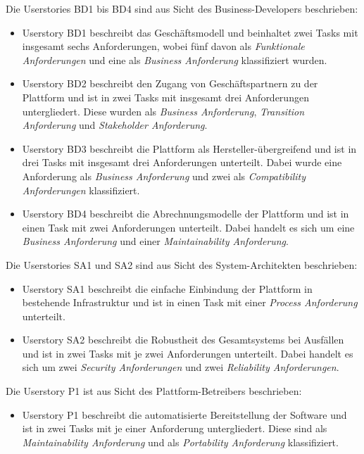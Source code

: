 Die Userstories BD1 bis BD4 sind aus Sicht des Business-Developers beschrieben:
\begin{itemize}
  \item Userstory BD1 beschreibt das Geschäftsmodell und beinhaltet zwei Tasks mit insgesamt sechs Anforderungen, wobei fünf davon als \textit{Funktionale Anforderungen} und eine als \textit{Business Anforderung} klassifiziert wurden.
  \item Userstory BD2 beschreibt den Zugang von Geschäftspartnern zu der Plattform und ist in zwei Tasks mit insgesamt drei Anforderungen untergliedert. Diese wurden als \textit{Business Anforderung}, \textit{Transition Anforderung} und \textit{Stakeholder Anforderung}.
  \item Userstory BD3 beschreibt die Plattform als Hersteller-übergreifend und ist in drei Tasks mit insgesamt drei Anforderungen unterteilt. Dabei wurde eine Anforderung als \textit{Business Anforderung} und zwei als \textit{Compatibility Anforderungen} klassifiziert.
  \item Userstory BD4 beschreibt die Abrechnungsmodelle der Plattform und ist in einen Task mit zwei Anforderungen unterteilt. Dabei handelt es sich um eine \textit{Business Anforderung} und einer \textit{Maintainability Anforderung}.
\end{itemize}

Die Userstories SA1 und SA2 sind aus Sicht des System-Architekten beschrieben:
\begin{itemize}
  \item Userstory SA1 beschreibt die einfache Einbindung der Plattform in bestehende Infrastruktur und ist in einen Task mit einer \textit{Process Anforderung} unterteilt.
  \item Userstory SA2 beschreibt die Robustheit des Gesamtsystems bei Ausfällen und ist in zwei Tasks mit je zwei Anforderungen unterteilt. Dabei handelt es sich um zwei \textit{Security Anforderungen} und zwei \textit{Reliability Anforderungen}.
\end{itemize}

Die Userstory P1 ist aus Sicht des Plattform-Betreibers beschrieben:
\begin{itemize}
  \item Userstory P1 beschreibt die automatisierte Bereitstellung der Software und ist in zwei Tasks mit je einer Anforderung untergliedert. Diese sind als \textit{Maintainability Anforderung} und als \textit{Portability Anforderung} klassifiziert.
\end{itemize}

